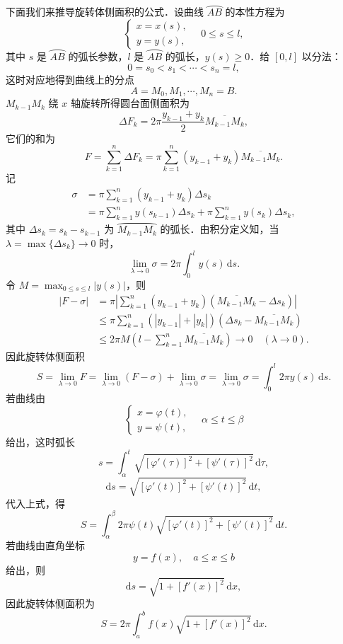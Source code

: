 下面我们来推导旋转体侧面积的公式．设曲线 $\wideparen{AB}$ 的本性方程为
\[
\begin{cases}
x = x(s), \\
y = y(s),
\end{cases}
\quad 0 \leqslant s \leqslant l,
\]
其中 $s$ 是 $\wideparen{AB}$ 的弧长参数，$l$ 是 $\wideparen{AB}$ 的弧长，$y(s) \geqslant 0$．给 $[0, l]$ 以分法：
\[
0 = s_0 < s_1 < \cdots < s_n = l,
\]
这时对应地得到曲线上的分点
\[
A = M_0, M_1, \cdots, M_n = B.
\]
$M_{k-1}M_k$ 绕 $x$ 轴旋转所得圆台面侧面积为
\[
\Delta F_k = 2\pi\frac{y_{k-1} + y_k}{2}\overline{M_{k-1}M_k},
\]
它们的和为
\[
F = \sum_{k=1}^n \Delta F_k = \pi\sum_{k=1}^n (y_{k-1} + y_k)\overline{M_{k-1}M_k}.
\]
记
\begin{align*}
\sigma &= \pi\sum_{k=1}^n (y_{k-1} + y_k)\Delta s_k \\
&= \pi\sum_{k=1}^n y(s_{k-1})\Delta s_k + \pi\sum_{k=1}^n y(s_k)\Delta s_k,
\end{align*}
其中 $\Delta s_k = s_k - s_{k-1}$ 为 $\wideparen{M_{k-1}M_k}$ 的弧长．由积分定义知，当 $\lambda = \max\{\Delta s_k\} \to 0$ 时，
\[
\lim_{\lambda\to 0}\sigma = 2\pi\int_0^l y(s)\,\mathrm{d}s.
\]
令 $M = \max_{0 \leqslant s \leqslant l}|y(s)|$，则
\begin{align*}
|F - \sigma| &= \pi\left|\sum_{k=1}^n (y_{k-1} + y_k)(\overline{M_{k-1}M_k} - \Delta s_k)\right| \\
&\leqslant \pi\sum_{k=1}^n (|y_{k-1}| + |y_k|)(\Delta s_k - \overline{M_{k-1}M_k}) \\
&\leqslant 2\pi M\left(l - \sum_{k=1}^n \overline{M_{k-1}M_k}\right) \to 0 \quad (\lambda \to 0).
\end{align*}
因此旋转体侧面积
\[
S = \lim_{\lambda\to 0}F = \lim_{\lambda\to 0}(F - \sigma) + \lim_{\lambda\to 0}\sigma = \lim_{\lambda\to 0}\sigma = \int_0^l 2\pi y(s)\,\mathrm{d}s.
\]
若曲线由
\[
\begin{cases}
x = \varphi(t), \\
y = \psi(t),
\end{cases}
\quad \alpha \leqslant t \leqslant \beta
\]
给出，这时弧长
\[
s = \int_\alpha^t \sqrt{[\varphi'(\tau)]^2 + [\psi'(\tau)]^2}\,\mathrm{d}\tau,
\]
\[
\mathrm{d}s = \sqrt{[\varphi'(t)]^2 + [\psi'(t)]^2}\,\mathrm{d}t,
\]
代入上式，得
\[
S = \int_\alpha^\beta 2\pi\psi(t)\sqrt{[\varphi'(t)]^2 + [\psi'(t)]^2}\,\mathrm{d}t.
\]
若曲线由直角坐标
\[
y = f(x), \quad a \leqslant x \leqslant b
\]
给出，则
\[
\mathrm{d}s = \sqrt{1 + [f'(x)]^2}\,\mathrm{d}x,
\]
因此旋转体侧面积为
\[
S = 2\pi\int_a^b f(x)\sqrt{1 + [f'(x)]^2}\,\mathrm{d}x.
\]

